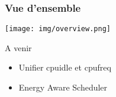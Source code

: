 \begin{frame}
	\frametitle{Vue d'ensemble}
	\begin{center}
		\texttt{[image: img/overview.png]}
	\end{center}
	\begin{block}{A venir}
		\begin{itemize}
			\item Unifier cpuidle et cpufreq
			\item Energy Aware Scheduler
		\end{itemize}
	\end{block}
\end{frame}
